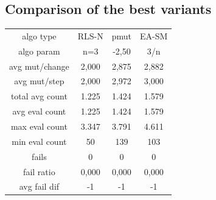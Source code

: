 \subsection{Comparison of the best variants}
\begin{tabular}[h]{cccc}
algo type&            RLS-N&      pmut&     EA-SM\\
algo param&             n=3&     -2,50&       3/n\\
avg mut/change&       2,000&     2,875&     2,882\\
avg mut/step&         2,000&     2,972&     3,000\\
\hline
total avg count&      1.225&     1.424&     1.579\\
avg eval count&       1.225&     1.424&     1.579\\
max eval count&       3.347&     3.791&     4.611\\
min eval count&          50&       139&       103\\
\hline
fails&                    0&         0&         0\\
fail ratio&           0,000&     0,000&     0,000\\
avg fail dif&            -1&        -1&        -1\\
\end{tabular}